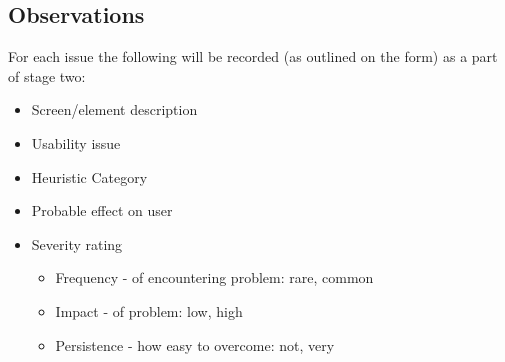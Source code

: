 \documentclass[a4 paper, 10pt]{article}
\begin{document}
    \subsection*{Observations}
    For each issue the following will be recorded (as outlined on the form) as a part of stage two:
        \begin{multicols}{2}
            \begin{itemize}
                \item Screen/element description
                \item Usability issue
                \item Heuristic Category
                \item Probable effect on user
                \item Severity rating
                    \begin{itemize}
                        \item Frequency - of encountering problem: rare, common
                        \item Impact - of problem: low, high
                        \item Persistence - how easy to overcome: not, very
                    \end{itemize}
            \end{itemize}  
        \end{multicols} 

 
\end{document}
